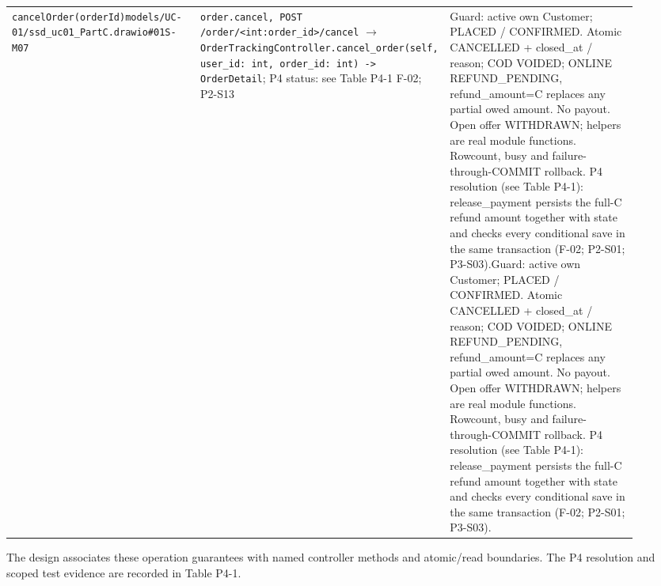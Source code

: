 \begin{longtable}{>{\raggedright\arraybackslash}p{0.3067\linewidth}>{\raggedright\arraybackslash}p{0.3067\linewidth}>{\raggedright\arraybackslash}p{0.3067\linewidth}}
\texttt{cancelOrder(orderId)}\newline{}\texttt{models/\allowbreak{}UC-01/\allowbreak{}ssd\_\allowbreak{}uc01\_\allowbreak{}PartC.\allowbreak{}drawio\#01S-M07} & \texttt{order.\allowbreak{}cancel, POST /\allowbreak{}order/\allowbreak{}\textless{}int:order\_\allowbreak{}id\textgreater{}/\allowbreak{}cancel} \ensuremath{\rightarrow} \texttt{OrderTrackingController.\allowbreak{}cancel\_\allowbreak{}order(self, user\_\allowbreak{}id: int, order\_\allowbreak{}id: int) -\textgreater{} OrderDetail}; P4 status: see Table P4-1 F-02; P2-S13 & Guard: active own Customer; PLACED / CONFIRMED. Atomic CANCELLED + closed\_at / reason; COD VOIDED; ONLINE REFUND\_PENDING, refund\_amount=C replaces any partial owed amount. No payout. Open offer WITHDRAWN; helpers are real module functions. Rowcount, busy and failure-through-COMMIT rollback. P4 resolution (see Table P4-1): release\_payment persists the full-C refund amount together with state and checks every conditional save in the same transaction (F-02; P2-S01; P3-S03).\newline{}Guard: active own Customer; PLACED / CONFIRMED. Atomic CANCELLED + closed\_at / reason; COD VOIDED; ONLINE REFUND\_PENDING, refund\_amount=C replaces any partial owed amount. No payout. Open offer WITHDRAWN; helpers are real module functions. Rowcount, busy and failure-through-COMMIT rollback. P4 resolution (see Table P4-1): release\_payment persists the full-C refund amount together with state and checks every conditional save in the same transaction (F-02; P2-S01; P3-S03). \\
\end{longtable}
The design associates these operation guarantees with named controller methods and atomic/read boundaries. The P4 resolution and scoped test evidence are recorded in Table P4-1.

